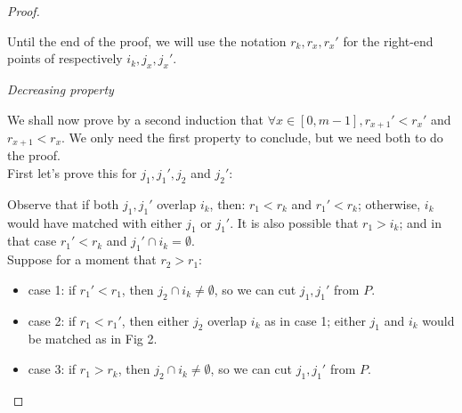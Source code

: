 \documentclass[12pt]{article}
\begin{document}
\begin{proof}
\begin{itemize}
    \end{itemize}

    Until the end of the proof, we will use the notation $r_k, r_x, r_x'$ for the right-end points of respectively $i_k, j_x, j_x'$. 
    \vspace{\baselineskip}

    \textit{Decreasing property}
    \vspace{\baselineskip}

    We shall now prove by a second induction that $\forall x \in [0, m-1], r_{x+1}' < r_x'$ and $r_{x+1} < r_x$. We only need the first property to conclude, but we need both to do the proof. \\
    First let's prove this for $j_1, j_1', j_2$ and $j_2'$:

    Observe that if both $j_1, j_1'$ overlap $i_k$, then: $r_1 < r_k$ and $r_1' < r_k$; otherwise, $i_k$ would have matched with either $j_1$ or $j_1'$. It is also possible that $r_1 > i_k$; and in that case $r_1' < r_k$ and $j_1' \cap i_k = \emptyset$. \\
    Suppose for a moment that $r_2 > r_1$: 
    \begin{itemize}
        \item case 1: if $r_1' < r_1$, then $j_2 \cap i_k \ne  \emptyset$, so we can cut $j_1, j_1'$ from $P$.
        \item case 2: if $r_1 < r_1'$, then either $j_2$ overlap $i_k$ as in case 1; either $j_1$ and $i_k$ would be matched as in Fig 2.  
        \item case 3: if $r_1 > r_k$, then $j_2 \cap i_k \ne  \emptyset$, so we can cut $j_1, j_1'$ from $P$.
    \end{itemize} 


\end{proof}
\end{document}
